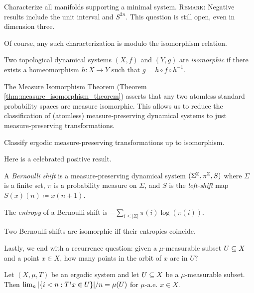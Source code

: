 \documentclass[reqno, twoside]{article}
\begin{document}
    \begin{open}
        Characterize all manifolds supporting a minimal system. \textsc{Remark:} Negative results include the unit interval and $S^{2n}$. This question is still open, even in dimension three.
    \end{open}

    Of course, any such characterization is modulo the isomorphism relation.

    \begin{definition}
        Two topological dynamical systems $(X,f)$ and $(Y,g)$ are \textit{isomorphic} if there exists a homeomorphism $h:X\to Y$ such that $g=h\circ f\circ h^{-1}$.
    \end{definition}

    The Measure Isomorphism Theorem (Theorem \ref{thm:measure_isomorphism_theorem}) asserts that any two atomless standard probability spaces are measure isomorphic. This allows us to reduce the classification of (atomless) measure-preserving dynamical systems to just measure-preserving transformations.

    \begin{open}
        Classify ergodic measure-preserving transformations up to isomorphism.
    \end{open}

    Here is a celebrated positive result.

    \begin{definition}
        A \textit{Bernoulli shift} is a measure-preserving dynamical system $(\Sigma^{\mathbb{Z}},\pi^{\mathbb{Z}},S)$ where $\Sigma$ is a finite set, $\pi$ is a probability measure on $\Sigma$, and $S$ is the \textit{left-shift} map $S(x)(n)\coloneqq x(n+1)$.

        The \textit{entropy} of a Bernoulli shift is $-\sum_{i\leq|\Sigma|}\pi(i)\log(\pi(i))$.
    \end{definition}

    \begin{theorem}[Ornstein]
        Two Bernoulli shifts are isomorphic iff their entropies coincide.
    \end{theorem}

    Lastly, we end with a recurrence question: given a $\mu$-measurable subset $U\subseteq X$ and a point $x\in X$, how many points in the orbit of $x$ are in $U$?

    \begin{theorem}
        Let $(X,\mu,T)$ be an ergodic system and let $U\subseteq X$ be a $\mu$-measurable subset. Then $\lim_n|\{i<n: T^ix\in U\}|/n=\mu(U)$ for $\mu$-a.e. $x\in X$.
    \end{theorem}
\end{document}
